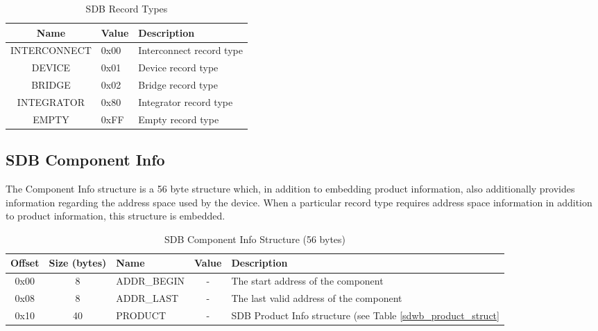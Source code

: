 \documentclass[a4paper, 12pt]{article}
\begin{document}
\begin{description}
\begin{center}
  \begin{savenotes}
    \begin{table}[!ht]\footnotesize
      \caption{SDB Record Types}\label{record_type}\centering
        \begin{tabular}{| c | l | p{5cm} |} \hline
        Name & Value & Description \\ \hline
        INTERCONNECT & 0x00 & Interconnect record type \\ \hline
        DEVICE & 0x01 & Device record type \\ \hline
        BRIDGE & 0x02 & Bridge record type \\ \hline
        INTEGRATOR & 0x80 & Integrator record type \\ \hline
        EMPTY & 0xFF & Empty record type \\ \hline
        \end{tabular}
    \end{table}
  \end{savenotes}
\end{center}
\end{description}

\subsection{SDB Component Info}

The Component Info structure is a 56 byte structure which, in addition to embedding product
information, also additionally provides information regarding the address space used by the
device. When a particular record type requires address space information in addition to product
information, this structure is embedded.

\begin{center}
  \begin{savenotes}
    \begin{table}[!ht]\footnotesize
      \caption{SDB Component Info Structure (56 bytes)}\label{sdwb_component_struct}\centering
        \begin{tabular}{| c | c | l | c | p{5cm} |} \hline
        Offset & Size (bytes) & Name & Value & Description \\ \hline
        0x00 & 8 & ADDR\_BEGIN & - & The start address of the component \\ \hline
        0x08 & 8 & ADDR\_LAST & - & The last valid address of the component \\ \hline
        0x10 & 40 & PRODUCT & - & SDB Product Info structure (see Table \ref{sdwb_product_struct} \\ \hline
        \end{tabular}
    \end{table}
  \end{savenotes}
\end{center}
\end{document}
